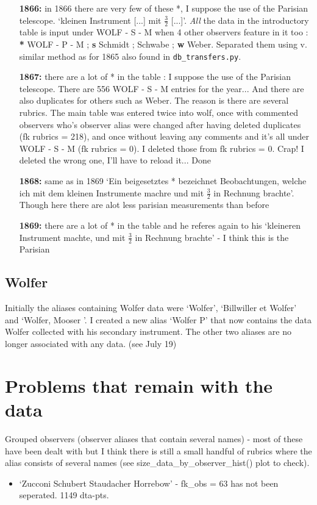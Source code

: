 \documentclass[12pt]{article}
\begin{document}
\begin{itemize}
     \item[\textbf{1866:}] in 1866 there are very few of these *,  I suppose the use of the Parisian telescope. `kleinen Instrument [...] mit $\frac{3}{2}$ [...]'.
     \textit{All} the data in the introductory table is input under WOLF - S - M when 4 other observers feature in it too : \textbf{*} WOLF - P - M ; \textbf{s} Schmidt ; \textbf{\dag} Schwabe ; \textbf{w} Weber. Separated them using v. similar method as for 1865 also found in \texttt{db\_transfers.py}. 
  \item[\textbf{1867:}] there are a lot of * in the table : I suppose the use of the Parisian telescope. There are 556 WOLF - S - M entries for the year... And there are also duplicates for others such as Weber. The reason is there are several rubrics. The main table was entered twice into wolf, once with commented observers who's observer alias were changed after having deleted duplicates (fk rubrics = 218), and once without leaving any comments and it's all under WOLF - S - M (fk rubrics = 0). I deleted those from fk rubrics = 0. Crap! I deleted the wrong one, I'll have to reload it... Done
   \item[\textbf{1868:}] same as in 1869 `Ein beigesetztes * bezeichnet Beobachtungen, welche ich mit dem kleinen Instrumente machre und mit $\frac{3}{2}$ in Rechnung brachte'. Though here there are alot less parisian measurements than before
\item[\textbf{1869:}] there are a lot of * in the table and he referes again to his `kleineren Instrument machte, und mit $\frac{3}{2}$ in Rechnung brachte' - I think this is the Parisian
    
\end{itemize}

\subsection{Wolfer}
Initially the aliases containing Wolfer data were `Wolfer', `Billwiller et Wolfer' and `Wolfer, Mooser '. I created a new alias `Wolfer P' that now contains the data Wolfer collected with his secondary instrument. The other two aliases are no longer associated with any data. (see July 19)


\section{Problems that remain with the data}
Grouped observers (observer aliases that contain several names) - most of these have been dealt with but I think there is still a small handful of rubrics where the alias consists of several names (see size\_data\_by\_observer\_hist() plot to check).
\begin{itemize}
    \item `Zucconi Schubert Staudacher Horrebow' - fk\_obs = 63 has not been seperated. 1149 dta-pts.
\end{itemize}
\end{document}
